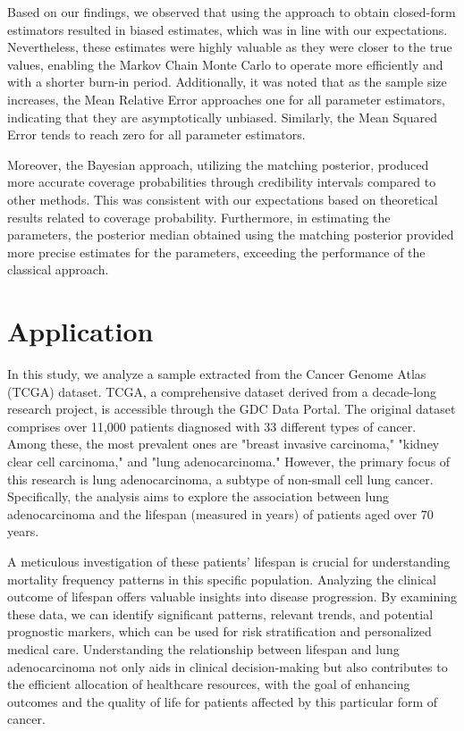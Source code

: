 Based on our findings, we observed that using the approach to obtain closed-form estimators resulted in biased estimates, which was in line with our expectations. Nevertheless, these estimates were highly valuable as they were closer to the true values, enabling the Markov Chain Monte Carlo to operate more efficiently and with a shorter burn-in period. Additionally, it was noted that as the sample size increases, the Mean Relative Error approaches one for all parameter estimators, indicating that they are asymptotically unbiased. Similarly, the Mean Squared Error tends to reach zero for all parameter estimators.

Moreover, the Bayesian approach, utilizing the matching posterior, produced more accurate coverage probabilities through credibility intervals compared to other methods. This was consistent with our expectations based on theoretical results related to coverage probability. Furthermore, in estimating the parameters, the posterior median obtained using the matching posterior provided more precise estimates for the parameters, exceeding the performance of the classical approach.

\section{Application}

In this study, we analyze a sample extracted from the Cancer Genome Atlas (TCGA) dataset. TCGA, a comprehensive dataset derived from a decade-long research project, is accessible through the GDC Data Portal. The original dataset comprises over 11,000 patients diagnosed with 33 different types of cancer. Among these, the most prevalent ones are "breast invasive carcinoma," "kidney clear cell carcinoma," and "lung adenocarcinoma." However, the primary focus of this research is lung adenocarcinoma, a subtype of non-small cell lung cancer. Specifically, the analysis aims to explore the association between lung adenocarcinoma and the lifespan (measured in years) of patients aged over 70 years.

A meticulous investigation of these patients' lifespan is crucial for understanding mortality frequency patterns in this specific population. Analyzing the clinical outcome of lifespan offers valuable insights into disease progression. By examining these data, we can identify significant patterns, relevant trends, and potential prognostic markers, which can be used for risk stratification and personalized medical care. Understanding the relationship between lifespan and lung adenocarcinoma not only aids in clinical decision-making but also contributes to the efficient allocation of healthcare resources, with the goal of enhancing outcomes and the quality of life for patients affected by this particular form of cancer.

